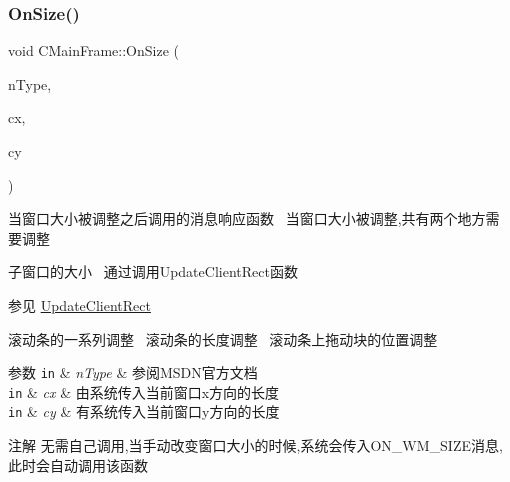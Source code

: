 \subsubsection{\texorpdfstring{On\+Size()}{OnSize()}}
{\footnotesize\ttfamily void C\+Main\+Frame\+::\+On\+Size (\begin{DoxyParamCaption}\item[{U\+I\+NT}]{n\+Type,  }\item[{int}]{cx,  }\item[{int}]{cy }\end{DoxyParamCaption})}



当窗口大小被调整之后调用的消息响应函数~\newline
当窗口大小被调整,共有两个地方需要调整~\newline



\begin{DoxyItemize}
\item 子窗口的大小~\newline
通过调用\+Update\+Client\+Rect函数 \begin{DoxySeeAlso}{参见}
\hyperlink{class_c_main_frame_a2500e3a6ace77e01430f5ff4b9a6f182}{Update\+Client\+Rect}
\end{DoxySeeAlso}

\item 滚动条的一系列调整~\newline
 滚动条的长度调整~\newline
 滚动条上拖动块的位置调整 
\begin{DoxyParams}[1]{参数}
\mbox{\tt in}  & {\em n\+Type} & 参阅\+M\+S\+D\+N官方文档 \\
\hline
\mbox{\tt in}  & {\em cx} & 由系统传入当前窗口x方向的长度 \\
\hline
\mbox{\tt in}  & {\em cy} & 有系统传入当前窗口y方向的长度 \\
\hline
\end{DoxyParams}
\begin{DoxyNote}{注解}
无需自己调用,当手动改变窗口大小的时候,系统会传入\+O\+N\+\_\+\+W\+M\+\_\+\+S\+I\+Z\+E消息,此时会自动调用该函数 
\end{DoxyNote}

\end{DoxyItemize}\mbox{\label{class_c_main_frame_a969c7e78dee0c54e7bcbe2ab9c901cc2}} 
